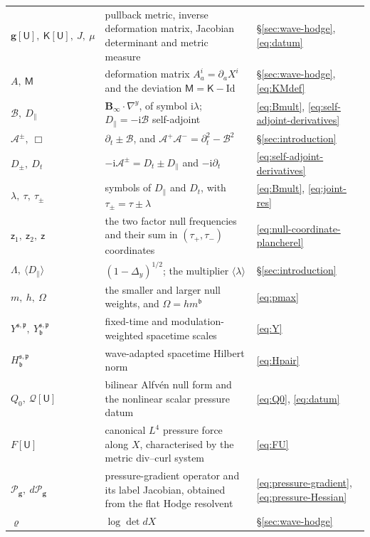 \documentclass[11pt,reqno]{amsart}
\theoremstyle{plain}
\theoremstyle{definition}
\theoremstyle{remark}
\numberwithin{equation}{section}
\newcommand{\breg}{\mathfrak b}
\newcommand{\sreg}{\mathfrak s}
\newcommand{\preg}{\mathfrak p}
\newcommand{\Ufield}{\mathsf U}
\newcommand{\Kmat}{\mathsf K}
\newcommand{\Mmat}{\mathsf M}
\newcommand{\gmetric}{\mathbf g}
\newcommand{\Binf}{\mathbf B_\infty}
\begin{document}
\begin{table}[htbp]
\begin{tabular}{@{}>{\raggedright\arraybackslash}p{}>{\raggedright\arraybackslash}p{}>{\raggedright\arraybackslash}p{}@{}}
$\gmetric[\Ufield],\ \Kmat[\Ufield],\ J,\ \mu$ & pullback metric, inverse deformation matrix, Jacobian determinant and metric measure & \S\ref{sec:wave-hodge}, \eqref{eq:datum} \\
$A,\ \Mmat$ & deformation matrix $A_a^i=\partial_aX^i$ and the deviation $\Mmat=\Kmat-\mathrm{Id}$ & \S\ref{sec:wave-hodge}, \eqref{eq:KMdef} \\
$\mathcal B,\ D_{\parallel}$ & $\Binf \cdot \nabla^{y}$, of symbol $\mathrm i\lambda$; $D_{\parallel}=-\mathrm i\mathcal B$ self-adjoint & \eqref{eq:Bmult}, \eqref{eq:self-adjoint-derivatives} \\
$\mathcal A^{\pm},\ \Box$ & $\partial_t\pm\mathcal B$, and $\mathcal A^{+}\mathcal A^{-}=\partial_t^2-\mathcal B^2$ & \S\ref{sec:introduction} \\
$D_{\pm},\ D_t$ & $-\mathrm i\mathcal A^{\pm}=D_t\pm D_{\parallel}$ and $-\mathrm i\partial_t$ & \eqref{eq:self-adjoint-derivatives} \\
$\lambda,\ \tau,\ \tau_\pm$ & symbols of $D_{\parallel}$ and $D_t$, with $\tau_\pm=\tau\pm\lambda$ & \eqref{eq:Bmult}, \eqref{eq:joint-res} \\
$\mathsf z_1,\ \mathsf z_2,\ \mathsf z$ & the two factor null frequencies and their sum in $(\tau_+,\tau_-)$ coordinates & \eqref{eq:null-coordinate-plancherel} \\
$\Lambda,\ \langle D_{\parallel}\rangle$ & $(1-\Delta_{y})^{1/2}$; the multiplier $\langle\lambda\rangle$ & \S\ref{sec:introduction} \\
$m,\ h,\ \Omega$ & the smaller and larger null weights, and $\Omega=h m^{\breg}$ & \eqref{eq:pmax} \\
$Y^{\sreg,\preg},\ Y^{\sreg,\preg}_{\breg}$ & fixed-time and modulation-weighted spacetime scales & \eqref{eq:Y} \\
$H^{\sreg,\preg}_{\breg}$ & wave-adapted spacetime Hilbert norm & \eqref{eq:Hpair} \\
$Q_0,\ \mathcal Q[\Ufield]$ & bilinear Alfv\'en null form and the nonlinear scalar pressure datum & \eqref{eq:Q0}, \eqref{eq:datum} \\
$F[\Ufield]$ & canonical $L^4$ pressure force along $X$, characterised by the metric div--curl system & \eqref{eq:FU} \\
$\mathcal P_{\gmetric},\ d\mathcal P_{\gmetric}$ & pressure-gradient operator and its label Jacobian, obtained from the flat Hodge resolvent & \eqref{eq:pressure-gradient}, \eqref{eq:pressure-Hessian} \\
$\varrho$ & $\log\det dX$ & \S\ref{sec:wave-hodge} \\

\end{tabular}
\end{table}
\end{document}
